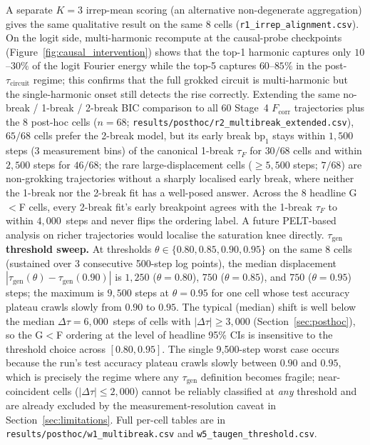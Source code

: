 \documentclass{article}
\newcommand{\taug}{\tau_{\mathrm{gen}}}
\newcommand{\tauf}{\tau_{F}}
\newcommand{\taucirc}{\tau_{\mathrm{circuit}}}
\newcommand{\Dtau}{\Delta\tau}
\newcommand{\fcorr}{F_{\mathrm{corr}}}
\begin{document}
A separate $K{=}3$ irrep-mean scoring (an alternative
non-degenerate aggregation) gives the same qualitative result on
the same 8 cells (\texttt{r1\_irrep\_alignment.csv}).
On the logit side, multi-harmonic recompute at the
causal-probe checkpoints (Figure~\ref{fig:causal_intervention})
shows that the top-1 harmonic captures only $10$--$30\%$ of the
logit Fourier energy while the top-5 captures $60$--$85\%$ in the
post-$\taucirc$ regime; this confirms that the full grokked
circuit is multi-harmonic but the single-harmonic onset still
detects the rise correctly.
Extending the same no-break / 1-break / 2-break BIC comparison to
all $60$ Stage~4 $\fcorr$ trajectories plus the $8$ post-hoc
cells ($n{=}68$;
\texttt{results/posthoc/r2\_multibreak\_extended.csv}), $65/68$
cells prefer the 2-break model, but its early break
$\mathrm{bp}_1$ stays within $1{,}500$ steps (3 measurement bins)
of the canonical 1-break $\tauf$ for $30/68$ cells and within
$2{,}500$ steps for $46/68$;
the rare large-displacement cells ($\geq 5{,}500$ steps;
$7/68$) are non-grokking trajectories without a sharply localised
early break, where neither the 1-break nor the 2-break fit has a
well-posed answer.
Across the $8$ headline G$<$F cells, every 2-break fit's early
breakpoint agrees with the 1-break $\tauf$ to within $4{,}000$~steps
and never flips the ordering label.
A future PELT-based analysis on richer trajectories would localise
the saturation knee directly.
\textbf{$\taug$ threshold sweep.}
At thresholds $\theta\in\{0.80, 0.85, 0.90, 0.95\}$ on the same 8
cells (sustained over 3 consecutive 500-step log points), the
median displacement $|\taug(\theta)-\taug(0.90)|$ is $1{,}250$
($\theta{=}0.80$), $750$ ($\theta{=}0.85$), and $750$
($\theta{=}0.95$) steps; the maximum is $9{,}500$ steps at
$\theta{=}0.95$ for one cell whose test accuracy plateau crawls
slowly from $0.90$ to $0.95$.
The typical (median) shift is well below the median
$\Dtau{=}6{,}000$~steps of cells with $|\Dtau|\geq3{,}000$
(Section~\ref{sec:posthoc}), so the G$<$F ordering at the level of
headline 95\% CIs is insensitive to the threshold choice across
$[0.80,0.95]$.
The single 9{,}500-step worst case occurs because the run's test
accuracy plateau crawls slowly between $0.90$ and $0.95$, which
is precisely the regime where any $\taug$ definition becomes
fragile; near-coincident cells ($|\Dtau|\leq 2{,}000$) cannot be
reliably classified at \emph{any} threshold and are already
excluded by the measurement-resolution caveat in
Section~\ref{sec:limitations}.
Full per-cell tables are in
\texttt{results/posthoc/w1\_multibreak.csv} and
\texttt{w5\_taugen\_threshold.csv}.
\end{document}
